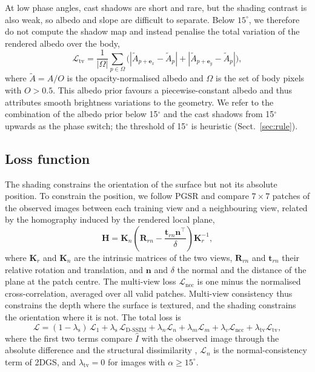 \documentclass[fleqn,usenatbib]{aa}
\newcommand{\vect}[1]{\boldsymbol{#1}}
\begin{document}
At low phase angles, cast shadows are short and rare, but the shading contrast is also weak, so albedo and slope are
difficult to separate. Below $15^\circ$, we therefore do not compute the shadow map and instead penalise the total
variation of the rendered albedo over the body,
\begin{equation}
\mathcal{L}_\mathrm{tv} = \frac{1}{|\Omega|}\sum_{p\in\Omega}\Big(\left|\tilde A_{p+\vect{e}_x}-\tilde A_p\right|
 + \left|\tilde A_{p+\vect{e}_y}-\tilde A_p\right|\Big),
\label{eq:tv}
\end{equation}
where $\tilde A=A/O$ is the opacity-normalised albedo and $\Omega$ is the set of body pixels with $O>0.5$. This albedo
prior favours a piecewise-constant albedo and thus attributes smooth brightness variations to the geometry. We refer to
the combination of the albedo prior below 15$^\circ$ and the cast shadows from 15$^\circ$ upwards as the phase switch; the threshold of 15$^\circ$ is heuristic (Sect.~\ref{sec:rule}).

\subsection{Loss function}
\label{sec:losses}

The shading constrains the orientation of the surface but not its absolute position. To constrain the position, we
follow PGSR \citep{Chen2024PGSR} and compare $7\times7$ patches of the observed images between each training view and
a neighbouring view, related by the homography induced by the rendered local plane,
\begin{equation}
\vect{H} = \vect{K}_n\left(\vect{R}_{rn} - \frac{\vect{t}_{rn}\vect{n}^\top}{\delta}\right)\vect{K}_r^{-1},
\label{eq:homography}
\end{equation}
where $\vect{K}_r$ and $\vect{K}_n$ are the intrinsic matrices of the two views, $\vect{R}_{rn}$ and $\vect{t}_{rn}$
their relative rotation and translation, and $\vect{n}$ and $\delta$ the normal and the distance of the plane at the
patch centre. The multi-view loss $\mathcal{L}_\mathrm{ncc}$ is one minus the normalised cross-correlation, averaged
over all valid patches. Multi-view consistency thus constrains the depth where the surface is textured, and the
shading constrains the orientation where it is not. The total loss is
\begin{equation}
\mathcal{L} = (1-\lambda_\mathrm{s})\,\mathcal{L}_1 + \lambda_\mathrm{s}\,\mathcal{L}_\mathrm{D\text{-}SSIM}
 + \lambda_n\mathcal{L}_n + \lambda_m\mathcal{L}_m + \lambda_v\mathcal{L}_\mathrm{ncc} + \lambda_\mathrm{tv}\mathcal{L}_\mathrm{tv},
\label{eq:loss}
\end{equation}
where the first two terms compare $\hat I$ with the observed image through the absolute difference and the structural
dissimilarity \citep{Kerbl2023}, $\mathcal{L}_n$ is the normal-consistency term of 2DGS, and $\lambda_\mathrm{tv}=0$ for
images with $\alpha\geq15^\circ$.
\end{document}
